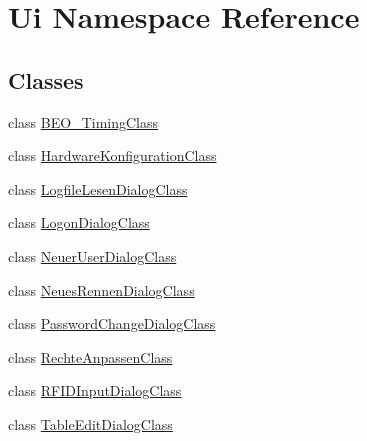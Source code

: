 \hypertarget{namespace_ui}{
\section{Ui Namespace Reference}
\label{namespace_ui}
}


\subsection*{Classes}
\begin{CompactItemize}
\item 
class \hyperlink{class_ui_1_1_b_e_o___timing_class}{BEO\_\-TimingClass}
\item 
class \hyperlink{class_ui_1_1_hardware_konfiguration_class}{HardwareKonfigurationClass}
\item 
class \hyperlink{class_ui_1_1_logfile_lesen_dialog_class}{LogfileLesenDialogClass}
\item 
class \hyperlink{class_ui_1_1_logon_dialog_class}{LogonDialogClass}
\item 
class \hyperlink{class_ui_1_1_neuer_user_dialog_class}{NeuerUserDialogClass}
\item 
class \hyperlink{class_ui_1_1_neues_rennen_dialog_class}{NeuesRennenDialogClass}
\item 
class \hyperlink{class_ui_1_1_password_change_dialog_class}{PasswordChangeDialogClass}
\item 
class \hyperlink{class_ui_1_1_rechte_anpassen_class}{RechteAnpassenClass}
\item 
class \hyperlink{class_ui_1_1_r_f_i_d_input_dialog_class}{RFIDInputDialogClass}
\item 
class \hyperlink{class_ui_1_1_table_edit_dialog_class}{TableEditDialogClass}
\end{CompactItemize}

